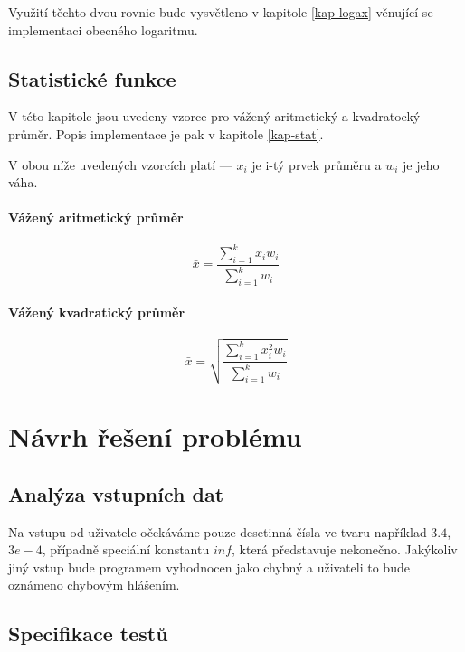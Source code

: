 \documentclass[12pt,a4paper,titlepage,final]{article}
\begin{document}
  Využití těchto dvou rovnic bude vysvětleno v kapitole \ref{kap-logax} věnující
  se implementaci obecného logaritmu.

\subsection{Statistické funkce}

V této kapitole jsou uvedeny vzorce pro vážený aritmetický a kvadratocký průměr.
Popis implementace je pak v kapitole \ref{kap-stat}.

V obou níže uvedených vzorcích platí --- $x_i$ je i-tý prvek průměru a $w_i$ je
jeho váha.

\paragraph{Vážený aritmetický průměr}

\[
\bar{x} = \frac{\sum^k_{i=1} x_i w_i}{\sum^k_{i=1} w_i}
\]

\paragraph{Vážený kvadratický průměr}

\[
\bar{x} = \sqrt{\frac{\sum^k_{i=1} x^2_i w_i}{\sum^k_{i=1} w_i}}
\]

\section{Návrh řešení problému} \label{navrh}


\subsection{Analýza vstupních dat}

Na vstupu od uživatele očekáváme pouze desetinná čísla ve tvaru například
$3.4$, $3e-4$, případně speciální konstantu $inf$, která představuje
nekonečno. Jakýkoliv jiný vstup bude programem vyhodnocen jako chybný a
uživateli to bude oznámeno chybovým hlášením.

\subsection{Specifikace testů} \label{testy}
\end{document}
